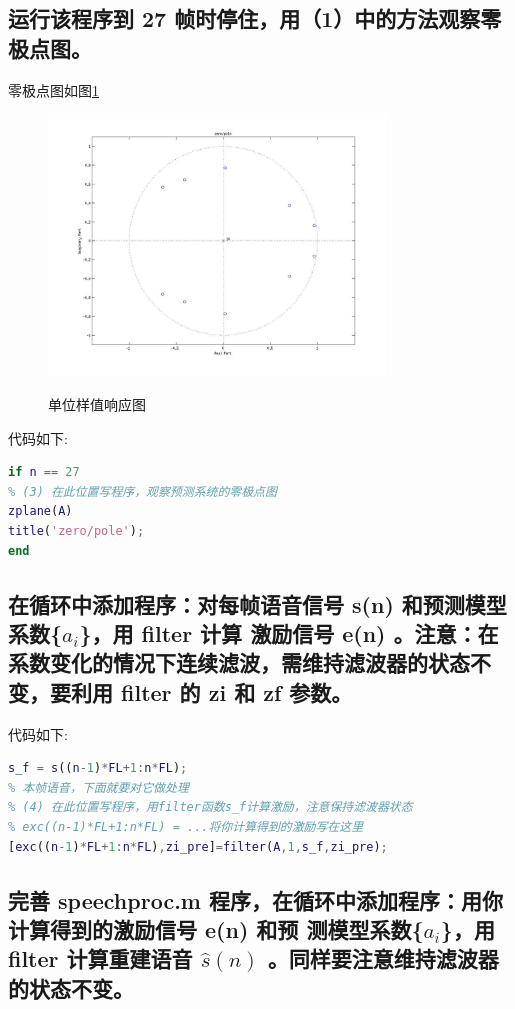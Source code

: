 \documentclass{ctexart}
\begin{document}
\subsection{
运行该程序到 27 帧时停住，用（1）中的方法观察零极点图。 }

零极点图如图\ref{2zp}
\begin{figure}
    \centering
    \includegraphics[width=0.8\textwidth]{2_zp.jpg}\\
    \caption{单位样值响应图\label{2zp}}
\end{figure}

代码如下:
\begin{lstlisting}[language=matlab]
if n == 27
% (3) 在此位置写程序，观察预测系统的零极点图
zplane(A)
title('zero/pole'); 
end
\end{lstlisting}

\subsection{
    在循环中添加程序：对每帧语音信号 s(n) 和预测模型系数\{$a_i$\}，用 filter 计算 激励信号 e(n) 。注意：在系数变化的情况下连续滤波，需维持滤波器的状态不变，要利用
    filter 的 zi 和 zf 参数。
}
代码如下:
\begin{lstlisting}[language=matlab]
s_f = s((n-1)*FL+1:n*FL);       
% 本帧语音，下面就要对它做处理
% (4) 在此位置写程序，用filter函数s_f计算激励，注意保持滤波器状态
% exc((n-1)*FL+1:n*FL) = ...将你计算得到的激励写在这里
[exc((n-1)*FL+1:n*FL),zi_pre]=filter(A,1,s_f,zi_pre);
\end{lstlisting}

\subsection{
完善 speechproc.m 程序，在循环中添加程序：用你计算得到的激励信号 e(n) 和预 测模型系数\{$a_i$\}，用 filter 计算重建语音 $\hat{s}(n)$ 。同样要注意维持滤波器的状态不变。 }
\end{document}
